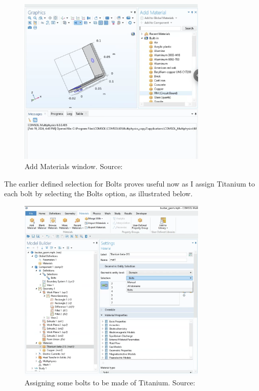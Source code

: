\begin{figure}[H]
  \centering
  \includegraphics[width=0.8\textwidth]{Chapters/Figures/Chapter 3 Figures/Add Material Window.png}
  \caption{Add Materials window. Source: \cite{multiphysics__modeling_nodate}}
  \label{fig:Add Materials window.}
\end{figure}

The earlier defined selection for Bolts proves useful now as I assign Titanium to each bolt by selecting the Bolts option, as illustrated below.

\begin{figure}[H]
  \centering
  \includegraphics[width=0.8\textwidth]{Chapters/Figures/Chapter 3 Figures/Bolts Selection Choice.png}
  \caption{Assigning some bolts to be made of Titanium. Source: \cite{multiphysics__modeling_nodate}}
  \label{fig:Assigning some bolts to be made of Titanium.}
\end{figure}

